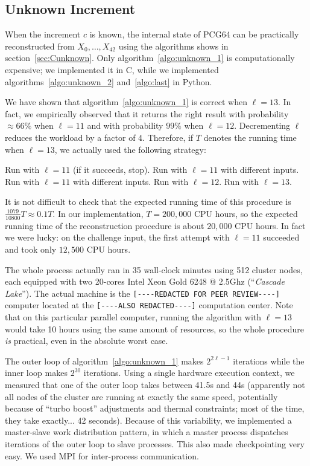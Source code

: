 \documentclass[submission,svgnames,journal=tosc]{iacrtrans}
\begin{document}
\subsection{Unknown Increment}

When the increment $c$ is known, the internal state of \textsf{PCG64} can be
practically reconstructed from $X_0, \dots, X_{42}$ using the algorithms shows
in section~\ref{sec:Cunknown}. Only algorithm~\ref{algo:unknown_1} is
computationally expensive; we implemented it in \textsf{C}, while we implemented
algorithms~\ref{algo:unknown_2} and~\ref{algo:last} in \textsf{Python}.

We have shown that algorithm~\ref{algo:unknown_1} is correct when $\ell=13$. In
fact, we empirically observed that it returns the right result with probability
$\approx 66\%$ when $\ell=11$ and with probability $99\%$ when
$\ell=12$. Decrementing $\ell$ reduces the workload by a factor of 4. Therefore,
if $T$ denotes the running time when $\ell=13$, we actually used the following
strategy:
\begin{algorithmic}[1]
\State Run with $\ell=11$ (if it succeeds, stop).
\State Run with $\ell=11$ with different inputs.
\State Run with $\ell=11$ with different inputs.
\State Run with $\ell=12$.
\State Run with $\ell=13$.
\end{algorithmic}
It is not difficult to check that the expected running time of this procedure is
$\frac{1079}{10800} T \approx 0.1 T$. In our implementation, $T = 200,000$ CPU
hours, so the expected running time of the reconstruction procedure is about
$20,000$ CPU hours. In fact we were lucky: on the challenge input, the first
attempt with $\ell=11$ succeeded and took only $12,500$ CPU hours.

The whole process actually ran in 35 wall-clock minutes using 512 cluster nodes,
each equipped with two 20-cores \textsf{Intel Xeon Gold 6248 @ 2.5Ghz}
(``\emph{Cascade Lake}''). The actual machine is the
\verb|[----REDACTED FOR PEER REVIEW----]| computer located at the
\verb|[----ALSO REDACTED----]| computation center. Note that on this particular
parallel computer, running the algorithm with $\ell=13$ would take 10 hours
using the same amount of resources, so the whole procedure \emph{is} practical,
even in the absolute worst case.

The outer loop of algorithm~\ref{algo:unknown_1} makes $2^{2\ell - 1}$
iterations while the inner loop makes $2^{30}$ iterations. Using a single
hardware execution context, we measured that one of the outer loop takes between
41.5s and 44s (apparently not all nodes of the cluster are running at exactly
the same speed, potentially because of ``turbo boost'' adjustments and thermal
constraints; most of the time, they take exactly... 42 seconds). Because of this
variability, we implemented a master-slave work distribution pattern, in which a
master process dispatches iterations of the outer loop to slave processes. This
also made checkpointing very easy. We used \textsf{MPI} for inter-process
communication.
\end{document}
